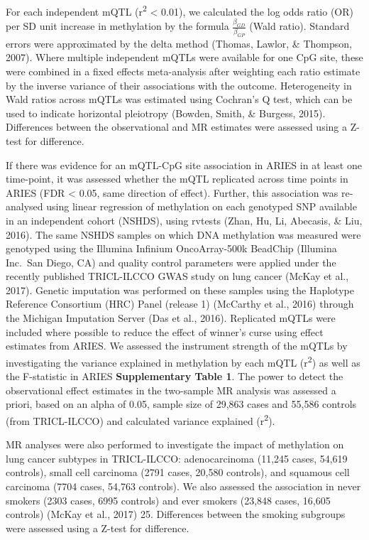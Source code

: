 \documentclass[11pt,twoside]{bristolthesis}
\begin{document}
For each independent mQTL (r\textsuperscript{2} \textless{} 0.01), we calculated the log odds ratio (OR) per SD unit increase in methylation by the formula \(\frac{\beta_{GD}} {\beta_{GP}}\) (Wald ratio). Standard errors were approximated by the delta method (Thomas, Lawlor, \& Thompson, 2007). Where multiple independent mQTLs were available for one CpG site, these were combined in a fixed effects meta-analysis after weighting each ratio estimate by the inverse variance of their associations with the outcome. Heterogeneity in Wald ratios across mQTLs was estimated using Cochran's Q test, which can be used to indicate horizontal pleiotropy (Bowden, Smith, \& Burgess, 2015). Differences between the observational and MR estimates were assessed using a Z-test for difference.

If there was evidence for an mQTL-CpG site association in ARIES in at least one time-point, it was assessed whether the mQTL replicated across time points in ARIES (FDR \textless{} 0.05, same direction of effect). Further, this association was re-analysed using linear regression of methylation on each genotyped SNP available in an independent cohort (NSHDS), using rvtests (Zhan, Hu, Li, Abecasis, \& Liu, 2016). The same NSHDS samples on which DNA methylation was measured were genotyped using the Illumina Infinium OncoArray-500k BeadChip (Illumina Inc.~San Diego, CA) and quality control parameters were applied under the recently published TRICL-ILCCO GWAS study on lung cancer (McKay et al., 2017). Genetic imputation was performed on these samples using the Haplotype Reference Consortium (HRC) Panel (release 1) (McCarthy et al., 2016) through the Michigan Imputation Server (Das et al., 2016). Replicated mQTLs were included where possible to reduce the effect of winner's curse using effect estimates from ARIES. We assessed the instrument strength of the mQTLs by investigating the variance explained in methylation by each mQTL (r\textsuperscript{2}) as well as the F-statistic in ARIES \textbf{Supplementary Table 1}. The power to detect the observational effect estimates in the two-sample MR analysis was assessed a priori, based on an alpha of 0.05, sample size of 29,863 cases and 55,586 controls (from TRICL-ILCCO) and calculated variance explained (r\textsuperscript{2}).

MR analyses were also performed to investigate the impact of methylation on lung cancer subtypes in TRICL-ILCCO: adenocarcinoma (11,245 cases, 54,619 controls), small cell carcinoma (2791 cases, 20,580 controls), and squamous cell carcinoma (7704 cases, 54,763 controls). We also assessed the association in never smokers (2303 cases, 6995 controls) and ever smokers (23,848 cases, 16,605 controls) (McKay et al., 2017) 25. Differences between the smoking subgroups were assessed using a Z-test for difference.
\end{document}
